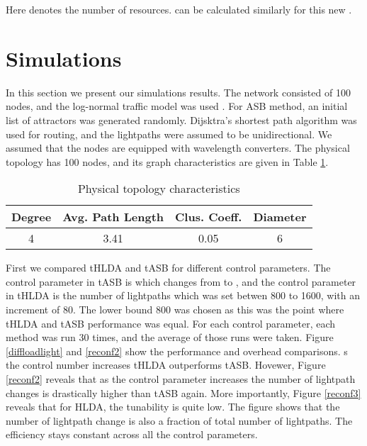 \documentclass[conference]{IEEEtran}
\begin{document}
Here  denotes the number of resources.  can be calculated similarly for this new . 
 
\section{Simulations} \label{simulations}
In this section we present our simulations results. 
The network consisted of 100 nodes, and the log-normal traffic model was used \cite{Nucci:PSGI05}.
For ASB method, an initial list of attractors was generated randomly. Dijsktra's shortest path algorithm was used for routing, and the lightpaths were assumed to  be unidirectional. We assumed that the nodes are equipped with wavelength converters.
 The physical topology has 100 nodes, and its graph characteristics are given in Table \ref{physicaltab}.
 
 \begin{table}[h]
\caption{Physical topology characteristics}
\centering
\begin{tabular}{cccc} \hline   \label{physicaltab}
   Degree &          Avg. Path Length & Clus. Coeff. &Diameter \\ \hline 
 	4    	&	3.41	& 0.05 					&	6		 \\	
\hline
\end{tabular}
\end{table}





First we compared tHLDA and tASB for different control parameters. 
The control parameter in tASB is  which changes from  to , and the control parameter in tHLDA is 
the number of lightpaths which was set betwen 800 to 1600, with an increment of 80.  
The lower bound 800 was chosen as this was the point where tHLDA and tASB performance was equal.
For each control parameter, each method was run 30 times, and the average of those runs were taken.
Figure \ref{diffloadlight} and \ref{reconf2} show the performance and overhead comparisons. 
s the control number increases tHLDA outperforms tASB. Hovewer, Figure \ref{reconf2} 	
reveals that as the control parameter increases the number of lightpath changes is drastically higher 
than tASB again. More importantly, Figure \ref{reconf3} reveals that for HLDA, the tunability is quite low.
The figure shows that the number of lightpath change is also a fraction of total number of lightpaths.
The efficiency stays constant across all the control parameters.
\end{document}
